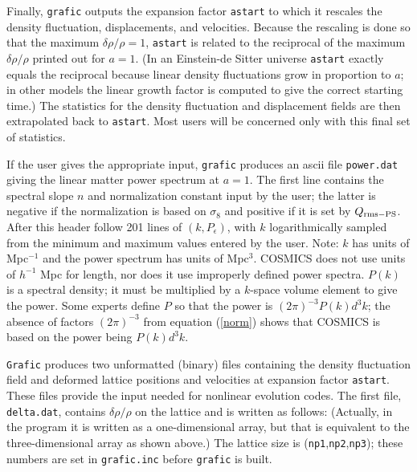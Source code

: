 Finally, {\tt grafic} outputs the expansion factor {\tt astart} to which
it rescales the density fluctuation, displacements, and velocities.
Because the rescaling is done so that the maximum $\delta\rho/\rho=1$,
{\tt astart} is related to the reciprocal of the maximum $\delta\rho/\rho$
printed out for $a=1$.  (In an Einstein-de Sitter universe {\tt astart}
exactly equals the reciprocal because linear density fluctuations grow in
proportion to $a$; in other models the linear growth factor is computed to
give the correct starting time.)  The statistics for the density fluctuation
and displacement fields are then extrapolated back to {\tt astart}.  Most
users will be concerned only with this final set of statistics.

If the user gives the appropriate input, {\tt grafic} produces an ascii
file {\tt power.dat} giving the linear matter power spectrum at $a=1$.
The first line contains the spectral slope $n$ and normalization constant
input by the user; the latter is negative if the normalization is based
on $\sigma_8$ and positive if it is set by $Q_{\rm rms-PS}$.  After
this header follow 201 lines of $(k,P_\epsilon)$, with $k$ logarithmically
sampled from the minimum and maximum values entered by the user.  Note:
$k$ has units of Mpc$^{-1}$ and the power spectrum has units of Mpc$^3$.
COSMICS does not use units of $h^{-1}$ Mpc for length, nor does it use
improperly defined power spectra.  $P(k)$ is a spectral density; it must
be multiplied by a $k$-space volume element to give the power.   Some
experts define $P$ so that the power is $(2\pi)^{-3}P(k)d^3k$; the
absence of factors $(2\pi)^{-3}$ from equation (\ref{norm}) shows
that COSMICS is based on the power being $P(k)d^3k$.

{\tt Grafic} produces two unformatted (binary) files containing the density
fluctuation field and deformed lattice positions and velocities at
expansion factor {\tt astart}.  These files provide the input needed for
nonlinear evolution codes.  The first file, {\tt delta.dat}, contains
$\delta\rho/\rho$ on the lattice and is written as follows:
\hfil{}
(Actually, in the program it is written as a one-dimensional array, but
that is equivalent to the three-dimensional array as shown above.)
The lattice size is ({\tt np1},{\tt np2},{\tt np3}); these numbers
are set in {\tt grafic.inc} before {\tt grafic} is built.

